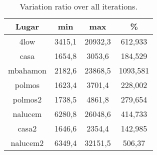 \begin{table}[h]
\caption[Page Benchmark Test: Variation ratio over all]{Variation ratio over all iterations.}
\begin{center}
\begin{tabular}{|c||c|c|c|}
\hline
Lugar & min & max & \% \\ \hline \hline
4low & 3415,1 & 20932,3 & 612,933 \\ \hline
casa & 1654,8 & 3053,6 & 184,529 \\ \hline
mbahamon & 2182,6 & 23868,5 & 1093,581 \\ \hline
polmos & 1623,4 & 3701,4 & 228,002 \\ \hline
polmos2 & 1738,5 & 4861,8 & 279,654 \\ \hline
nalucem & 6280,8 & 26048,6 & 414,733 \\ \hline
casa2 & 1646,6 & 2354,4 & 142,985 \\ \hline
nalucem2 & 6349,4 & 32151,5 & 506,37 \\ \hline
\end{tabular}
\end{center}
\label{table:variationnet}
\end{table}